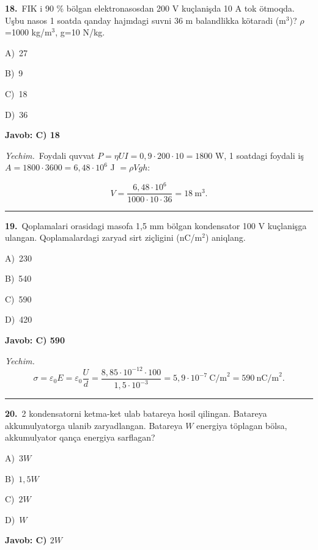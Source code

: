 \documentclass[11pt,a4paper]{article}
\newcommand{\opt}[2]{\hspace*{4mm}#1)\ #2\par}
\begin{document}
\noindent\begin{minipage}{\linewidth}
\textbf{18.}\ FIK i 90 \% bölgan elektronasosdan 200 V kuçlanişda 10 A tok ötmoqda. Uşbu nasos 1 soatda qanday hajmdagi suvni 36 m balandlikka kötaradi (m$^{3}$)? $\rho$=1000 kg/m$^{3}$, g=10 N/kg.\par\smallskip
\opt{A}{27}
\opt{B}{9}
\opt{C}{18}
\opt{D}{36}
\end{minipage}\vspace{2pt}\par
\noindent\colorbox{gray!12}{\parbox{\dimexpr\linewidth-2\fboxsep}{\textbf{Javob: C) 18}}}\par\smallskip
\noindent\textit{Yechim.}\ Foydali quvvat $P=\eta UI=0{,}9\cdot200\cdot10=1800$ W, 1 soatdagi foydali iş $A=1800\cdot3600=6{,}48\cdot10^6$ J $=\rho Vgh$:\par
\[V=\frac{6{,}48\cdot10^6}{1000\cdot10\cdot36}=18\ \text{m}^3.\]\par\medskip\hrule\medskip
{}\noindent\begin{minipage}{\linewidth}
\textbf{19.}\ Qoplamalari orasidagi masofa 1,5 mm bölgan kondensator 100 V kuçlanişga ulangan. Qoplamalardagi zaryad sirt ziçligini (nC/m$^{2}$) aniqlang.\par\smallskip
\opt{A}{230}
\opt{B}{540}
\opt{C}{590}
\opt{D}{420}
\end{minipage}\vspace{2pt}\par
\noindent\colorbox{gray!12}{\parbox{\dimexpr\linewidth-2\fboxsep}{\textbf{Javob: C) 590}}}\par\smallskip
\noindent\textit{Yechim.}\ \[\sigma=\varepsilon_0E=\varepsilon_0\frac{U}{d}=\frac{8{,}85\cdot10^{-12}\cdot100}{1{,}5\cdot10^{-3}}=5{,}9\cdot10^{-7}\ \text{C/m}^2=590\ \text{nC/m}^2.\]\par\medskip\hrule\medskip
{}\noindent\begin{minipage}{\linewidth}
\textbf{20.}\ 2 kondensatorni ketma-ket ulab batareya hosil qilingan. Batareya akkumulyatorga ulanib zaryadlangan. Batareya $W$ energiya töplagan bölsa, akkumulyator qança energiya sarflagan?\par\smallskip
\opt{A}{$3W$}
\opt{B}{$1{,}5W$}
\opt{C}{$2W$}
\opt{D}{$W$}
\end{minipage}\vspace{2pt}\par
\noindent\colorbox{gray!12}{\parbox{\dimexpr\linewidth-2\fboxsep}{\textbf{Javob: C) $2W$}}}\par\smallskip
\end{document}
